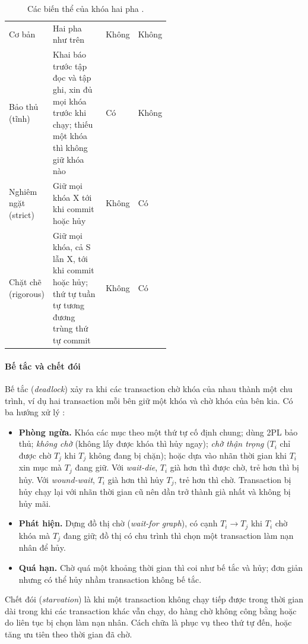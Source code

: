 \begin{table}[!htbp]
\centering
\caption{Các biến thể của khóa hai pha \cite{cc-silberschatz2019, cc-elmasri2016}.}\label{tab:cc-2pl}
\reporttablesetup
\begin{tabularx}{\linewidth}{|P{0.2\linewidth}|L|P{0.14\linewidth}|P{0.2\linewidth}|}
\hline
{}
 &  &  &  \\ \hline
Cơ bản & Hai pha như trên & Không & Không \\ \hline
Bảo thủ (tĩnh) & Khai báo trước tập đọc và tập ghi, xin đủ mọi khóa trước khi chạy; thiếu một khóa thì không giữ khóa nào & Có & Không \\ \hline
Nghiêm ngặt (strict) & Giữ mọi khóa X tới khi commit hoặc hủy & Không & Có \\ \hline
Chặt chẽ (rigorous) & Giữ mọi khóa, cả S lẫn X, tới khi commit hoặc hủy; thứ tự tuần tự tương đương trùng thứ tự commit & Không & Có \\ \hline
\end{tabularx}
\end{table}

\paragraph{Bế tắc và chết đói}
Bế tắc (\emph{deadlock}) xảy ra khi các transaction chờ khóa của nhau thành một chu trình, ví dụ hai transaction mỗi bên giữ một khóa và chờ khóa của bên kia. Có ba hướng xử lý \cite{cc-silberschatz2019, cc-elmasri2016}:
\begin{itemize}
  \item \textbf{Phòng ngừa.} Khóa các mục theo một thứ tự cố định chung; dùng 2PL bảo thủ; \emph{không chờ} (không lấy được khóa thì hủy ngay); \emph{chờ thận trọng} ($T_i$ chỉ được chờ $T_j$ khi $T_j$ không đang bị chặn); hoặc dựa vào nhãn thời gian khi $T_i$ xin mục mà $T_j$ đang giữ. Với \emph{wait-die}, $T_i$ già hơn thì được chờ, trẻ hơn thì bị hủy. Với \emph{wound-wait}, $T_i$ già hơn thì hủy $T_j$, trẻ hơn thì chờ. Transaction bị hủy chạy lại với nhãn thời gian cũ nên dần trở thành già nhất và không bị hủy mãi.
  \item \textbf{Phát hiện.} Dựng đồ thị chờ (\emph{wait-for graph}), có cạnh $T_i \rightarrow T_j$ khi $T_i$ chờ khóa mà $T_j$ đang giữ; đồ thị có chu trình thì chọn một transaction làm nạn nhân để hủy.
  \item \textbf{Quá hạn.} Chờ quá một khoảng thời gian thì coi như bế tắc và hủy; đơn giản nhưng có thể hủy nhầm transaction không bế tắc.
\end{itemize}
Chết đói (\emph{starvation}) là khi một transaction không chạy tiếp được trong thời gian dài trong khi các transaction khác vẫn chạy, do hàng chờ không công bằng hoặc do liên tục bị chọn làm nạn nhân. Cách chữa là phục vụ theo thứ tự đến, hoặc tăng ưu tiên theo thời gian đã chờ.

